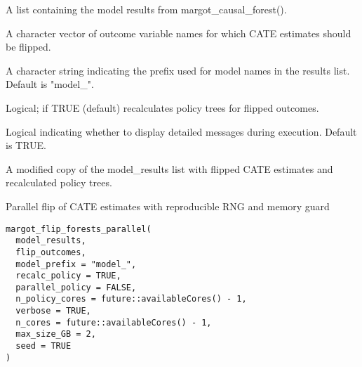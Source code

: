 \documentclass[a4paper]{book}
\begin{document}
\begin{Arguments}
\begin{ldescription}
\item[\code{model\_results}] A list containing the model results from margot\_causal\_forest().

\item[\code{flip\_outcomes}] A character vector of outcome variable names for which CATE estimates should be flipped.

\item[\code{model\_prefix}] A character string indicating the prefix used for model names in the results list. Default is "model\_".

\item[\code{recalc\_policy}] Logical; if TRUE (default) recalculates policy trees for flipped outcomes.

\item[\code{verbose}] Logical indicating whether to display detailed messages during execution. Default is TRUE.
\end{ldescription}
\end{Arguments}
%
\begin{Value}
A modified copy of the model\_results list with flipped CATE estimates and recalculated policy trees.
\end{Value}
%
\begin{Description}
Parallel flip of CATE estimates with reproducible RNG and memory guard
\end{Description}
%
\begin{Usage}
\begin{verbatim}
margot_flip_forests_parallel(
  model_results,
  flip_outcomes,
  model_prefix = "model_",
  recalc_policy = TRUE,
  parallel_policy = FALSE,
  n_policy_cores = future::availableCores() - 1,
  verbose = TRUE,
  n_cores = future::availableCores() - 1,
  max_size_GB = 2,
  seed = TRUE
)
\end{verbatim}
\end{Usage}
%
\end{document}

